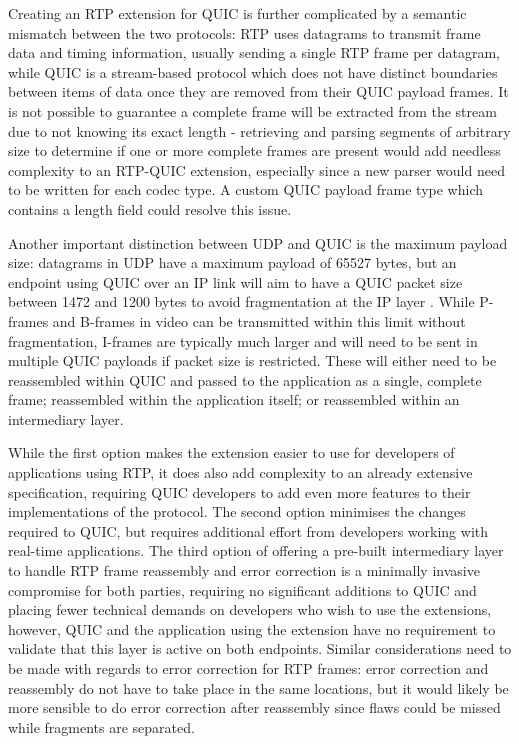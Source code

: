 \documentclass{mprop}
\begin{document}
Creating an RTP extension for QUIC is further complicated by a semantic mismatch between the two protocols: RTP uses datagrams to transmit frame data and timing information, usually sending a single RTP frame per datagram, while QUIC is a stream-based protocol which does not have distinct boundaries between items of data once they are removed from their QUIC payload frames. It is not possible to guarantee a complete frame will be extracted from the stream due to not knowing its exact length - retrieving and parsing segments of arbitrary size to determine if one or more complete frames are present would add needless complexity to an RTP-QUIC extension, especially since a new parser would need to be written for each codec type. A custom QUIC payload frame type which contains a length field could resolve this issue.

Another important distinction between UDP and QUIC is the maximum payload size: datagrams in UDP have a maximum payload of 65527 bytes, but an endpoint using QUIC over an IP link will aim to have a QUIC packet size between 1472 and 1200 bytes to avoid fragmentation at the IP layer \cite{quic-transport-16}. While P-frames and B-frames in video can be transmitted within this limit without fragmentation, I-frames are typically much larger and will need to be sent in multiple QUIC payloads if packet size is restricted. These will either need to be reassembled within QUIC and passed to the application as a single, complete frame; reassembled within the application itself; or reassembled within an intermediary layer.

While the first option makes the extension easier to use for developers of applications using RTP, it does also add complexity to an already extensive specification, requiring QUIC developers to add even more features to their implementations of the protocol. The second option minimises the changes required to QUIC, but requires additional effort from developers working with real-time applications. The third option of offering a pre-built intermediary layer to handle RTP frame reassembly and error correction is a minimally invasive compromise for both parties, requiring no significant additions to QUIC and placing fewer technical demands on developers who wish to use the extensions, however, QUIC and the application using the extension have no requirement to validate that this layer is active on both endpoints. Similar considerations need to be made with regards to error correction for RTP frames: error correction and reassembly do not have to take place in the same locations, but it would likely be more sensible to do error correction after reassembly since flaws could be missed while fragments are separated.
\end{document}
